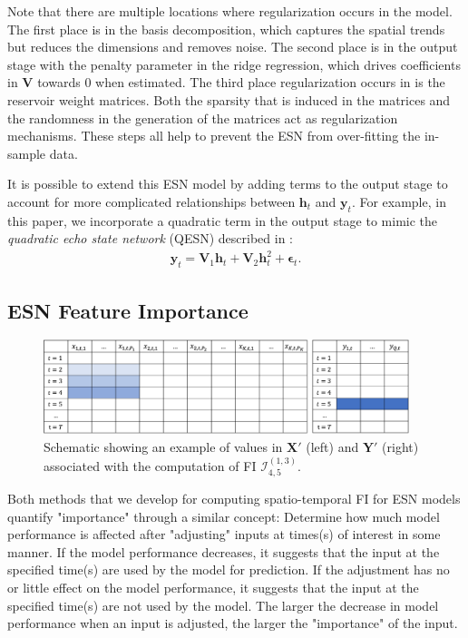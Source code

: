 \documentclass[AMS,STIX2COL]{WileyNJD-v2}
\begin{document}
Note that there are multiple locations where regularization occurs in the model. The first place is in the basis decomposition, which captures the spatial trends but reduces the dimensions and removes noise. The second place is in the output stage with the penalty parameter in the ridge regression, which drives coefficients in $\textbf{V}$ towards 0 when estimated. The third place regularization occurs in is the reservoir weight matrices. Both the sparsity that is induced in the matrices and the randomness in the generation of the matrices act as regularization mechanisms. These steps all help to prevent the ESN from over-fitting the in-sample data.

It is possible to extend this ESN model by adding terms to the output stage to account for more complicated relationships between $\textbf{h}_t$ and $\textbf{y}_{t}$. For example, in this paper, we incorporate a quadratic term in the output stage to mimic the \emph{quadratic echo state network} (QESN) described in \citet{mcdermott2019}: \begin{align}
    \textbf{y}_{t} = \mathbf{V}_1 \mathbf{h}_t + \mathbf{V}_2 \mathbf{h}_t^2 + \boldsymbol{\epsilon}_{t}.
\end{align}

\subsection{ESN Feature Importance} \label{sec:fi}

\begin{figure}
    \centering
    \includegraphics[width=0.95\textwidth]{figures/fi-demo.png}
    \caption{Schematic showing an example of values in $\textbf{X}'$ (left) and $\textbf{Y}'$ (right) associated with the computation of FI $\mathcal{I}_{4,5}^{(1,3)}$.}
    \label{fig:fi-demo}
\end{figure}

Both methods that we develop for computing spatio-temporal FI for ESN models quantify "importance" through a similar concept: Determine how much model performance is affected after "adjusting" inputs at times(s) of interest in some manner. If the model performance decreases, it suggests that the input at the specified time(s) are used by the model for prediction. If the adjustment has no or little effect on the model performance, it suggests that the input at the specified time(s) are not used by the model. The larger the decrease in model performance when an input is adjusted, the larger the "importance" of the input.
\end{document}
